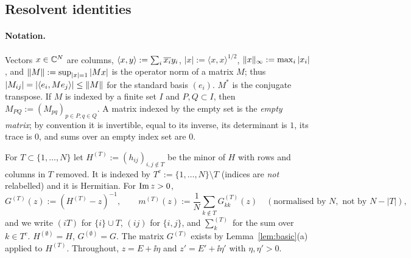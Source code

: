 \subsection{Resolvent identities}\label{sec:resid}

\paragraph{Notation.} Vectors $x\in\mathbb{C}^N$ are columns, $\langle x,y\rangle:=\sum_i\overline{x_i}y_i$, $|x|:=\langle x,x\rangle^{1/2}$, $\|x\|_\infty:=\max_i|x_i|$, and
$\|M\|:=\sup_{|x|=1}|Mx|$ is the operator norm of a matrix $M$; thus $|M_{ij}|=|\langle e_i,Me_j\rangle|\le\|M\|$ for the standard basis $(e_i)$.
$M^*$ is the conjugate transpose. If $M$ is indexed by a finite set $I$ and $P,Q\subset I$, then $M_{PQ}:=(M_{pq})_{p\in P,q\in Q}$.
A matrix indexed by the empty set is the \emph{empty matrix}; by convention it is invertible, equal to its inverse, its determinant is $1$, its trace is $0$, and sums over an empty index set are $0$.

For $T\subset\{1,\dots,N\}$ let $H^{(T)}:=(h_{ij})_{i,j\notin T}$ be the minor of $H$ with rows and columns in $T$ removed. It is indexed by $T^c:=\{1,\dots,N\}\setminus T$
(indices are \emph{not} relabelled) and it is Hermitian. For $\operatorname{Im} z>0$,
\[
 G^{(T)}(z):=(H^{(T)}-z)^{-1},\qquad m^{(T)}(z):=\frac1N\sum_{k\notin T}G^{(T)}_{kk}(z)\quad(\text{normalised by }N,\text{ not by }N-|T|),
\]
and we write $(iT)$ for $\{i\}\cup T$, $(ij)$ for $\{i,j\}$, and $\sum^{(T)}_k$ for the sum over $k\in T^c$. $H^{(\emptyset)}=H$, $G^{(\emptyset)}=G$.
The matrix $G^{(T)}$ exists by Lemma~\ref{lem:basic}(a) applied to $H^{(T)}$. Throughout, $z=E+\ii\eta$ and $z'=E'+\ii\eta'$ with $\eta,\eta'>0$.

